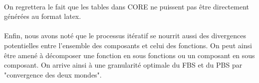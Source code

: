 \paragraph{}
On regrettera le fait que les tables dans CORE ne puissent pas être directement générées au format latex. 

\paragraph{}
Enfin, nous avons noté que le processus itératif se nourrit aussi des divergences potentielles entre l'ensemble des composants et celui des fonctions. On peut ainsi être amené à décomposer une fonction en sous fonctions ou un composant en sous composant. On arrive ainsi à une granularité optimale du FBS et du PBS  par "convergence des deux mondes".  

